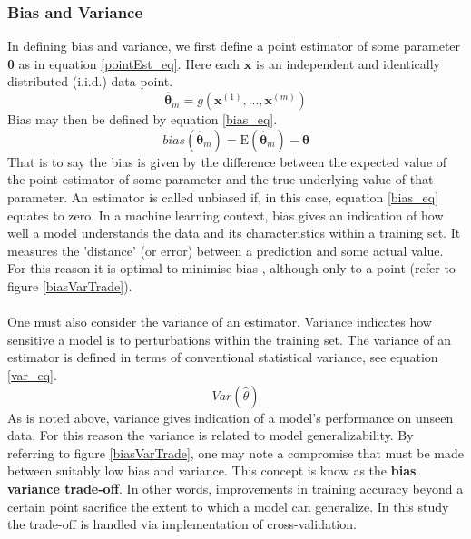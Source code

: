 \subsubsection{Bias and Variance}
In defining bias and variance, we first define a point estimator of some parameter $\pmb{\theta}$ as in equation \ref{pointEst_eq}. Here each $\pmb{x}$ is an independent and identically distributed (i.i.d.) data point.
\begin{equation}
    \hat{\pmb{\theta}}_m = g(\pmb{x}^{(1)}, ..., \pmb{x}^{(m)})
    \label{pointEst_eq}
\end{equation}
Bias may then be defined by equation \ref{bias_eq}.
\begin{equation}
    bias(\hat{\pmb{\theta}}_m) = \mathrm{E}(\hat{\pmb{\theta}}_m) - \pmb{\theta}
    \label{bias_eq}
\end{equation}
That is to say the bias is given by the difference between the expected value of the point estimator of some parameter and the true underlying value of that parameter. An estimator is called unbiased if, in this case, equation \ref{bias_eq} equates to zero. In a machine learning context, bias gives an indication of how well a model understands the data and its characteristics within a training set. It measures the 'distance' (or error) between a prediction and some actual value. For this reason it is optimal to minimise bias , although only to a point (refer to figure \ref{biasVarTrade}).\\ \\
One must also consider the variance of an estimator. Variance indicates how sensitive a model is to perturbations within the training set. The variance of an estimator is defined in terms of conventional statistical variance, see equation \ref{var_eq}.
\begin{equation}
    Var(\hat{\theta})
    \label{var_eq}
\end{equation}
As is noted above, variance gives indication of a model's performance on unseen data. For this reason the variance is related to model generalizability. By referring to figure \ref{biasVarTrade}, one may note a compromise that must be made between suitably low bias and variance. This concept is know as the \textbf{bias variance trade-off}. In other words, improvements in training accuracy beyond a certain point sacrifice the extent to which a model can generalize. In this study the trade-off is handled via implementation of cross-validation. 

